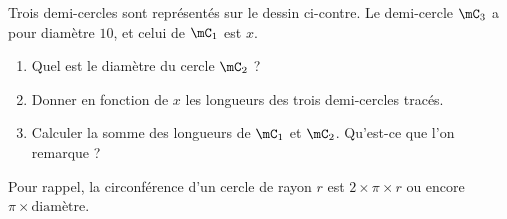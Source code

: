 
\begin{exercice}\label{exo2smath-0156}

%   

    \begin{multicols}{2}
    Trois demi-cercles sont représentés sur le dessin ci-contre. Le demi-cercle \( \mC_3\) a pour diamètre \( 10\), et celui de \( \mC_1\) est \( x\).

    \begin{enumerate}
        \item
            Quel est le diamètre du cercle \( \mC_2\) ?
        \item
            Donner en fonction de \( x\) les longueurs des trois demi-cercles tracés.
        \item   \label{ItemCUFLooIdJOVd}
            Calculer la somme des longueurs de \( \mC_1\) et \( \mC_2\). Qu'est-ce que l'on remarque ?
    \end{enumerate}

    \columnbreak

    \begin{center}
   
    \end{center}
    \end{multicols}
    Pour rappel, la circonférence d'un cercle de rayon \( r\) est \( 2\times \pi\times r\) ou encore \( \pi\times \text{diamètre}\).

\end{exercice}
